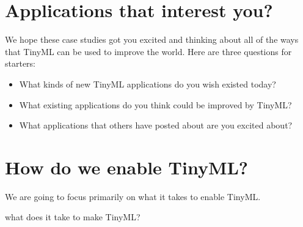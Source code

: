 \section{Applications that interest you?}


We hope these case studies got you excited and thinking about all of the ways that TinyML can be used to improve the world.  Here are three questions for starters: 

\begin{itemize}
    \item What kinds of new TinyML applications do you wish existed today?
    \item What existing applications do you think could be improved by TinyML?
    \item What applications that others have posted about are you excited about?
\end{itemize}




\section{How do we enable TinyML?}


We are  going to focus primarily on what it takes to enable TinyML.

what does it take to make TinyML?

